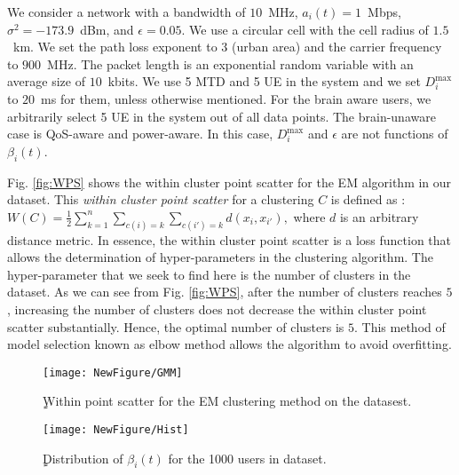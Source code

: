 \documentclass[journal,draftclsnofoot,onecolumn,12pt]{IEEEtran}%
\begin{document}
We consider a network with a bandwidth of $10$~MHz, $a_i(t)=1$~Mbps, $\sigma^2=-173.9$~dBm, and $\epsilon=0.05$.  We use a circular cell with the cell radius of $1.5$~km. We set the path loss exponent to $3$ (urban area) and the carrier frequency to $900$~MHz. The packet length is an exponential random variable with an average size of $10$~kbits. We use 5 MTD and 5 UE in the system  and we set $D_i^{\max}$ to $20$~ms for them, unless otherwise mentioned. For the brain aware users, we arbitrarily select 5 UE in the system out of all data points. {The brain-unaware case is QoS-aware and power-aware. In this case, $D_i^{\max}$ and $\epsilon$ are not functions of $\beta_i(t)$.}




Fig. \ref{fig:WPS} shows the within cluster point scatter for the EM algorithm in our dataset. This \emph{within cluster point scatter} for a clustering $C$ is defined as \cite{friedman2001elements}: 
$
W(C)=\frac{1}{2}\sum_{k=1}^n\sum_{c(i)=k}\sum_{c(i')=k}d(x_i,x_{i'}),
$
where $d$ is an arbitrary distance metric. In essence, the within cluster point scatter is a loss function that allows the determination of hyper-parameters in the clustering algorithm. The hyper-parameter that we seek to find here is the number of clusters in the dataset. As we can see from Fig. \ref{fig:WPS}, after the number of clusters reaches $5$, increasing the number of clusters does not decrease the within cluster point scatter substantially. Hence, the optimal number of clusters is $5$. {This method of model selection known as elbow method allows the algorithm to avoid overfitting.}


\begin{figure}[!t]
    \begin{minipage}{0.5\textwidth}
		\centering
		\texttt{[image: NewFigure/GMM]}
		\caption{ٍWithin point scatter for the EM clustering method on the datasest.}
		\label{fig:WPS}
	\end{minipage}
    	\begin{minipage}{0.5\textwidth}
		\centering
		\texttt{[image: NewFigure/Hist]}
		\caption{ٍDistribution of $\beta_i(t)$ for the 1000 users in dataset.}
		\label{fig:Hist}
        \end{minipage}
	\end{figure}  
\end{document}
